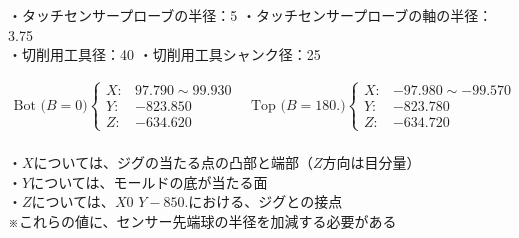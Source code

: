 




\begin{tcolorbox}[title={内面溝加工に関する工具(T31, T50)の情報}, fonttitle=\gtfamily\bfseries]
・タッチセンサープローブの半径：5 \quad ・タッチセンサープローブの軸の半径：3.75\\
・切削用工具径：40 \quad ・切削用工具シャンク径：25
\end{tcolorbox}
\begin{tcolorbox}[title={2023/07/28時点の\MMname 実測値}, fonttitle=\gtfamily\bfseries]
\begin{align*}
  \text{Bot ($B=0$)}
  \left\{
  \begin{array}{rl}
    X: & 97.790 \sim 99.930\\
    Y: & -823.850\\
    Z: & -634.620
  \end{array}
  \right.\quad
  \text{Top ($B=180.$)}
  \left\{
  \begin{array}{rl}
    X: & -97.980 \sim -99.570\\
    Y: & -823.780\\
    Z: & -634.720
  \end{array}
  \right.
\end{align*}\\
・$X$については、ジグの当たる点の凸部と端部（$Z$方向は目分量）\\
・$Y$については、モールドの底が当たる面\\
・$Z$については、$X0$ $Y-850.$における、ジグとの接点\\
※これらの値に、センサー先端球の半径を加減する必要がある
\end{tcolorbox}










